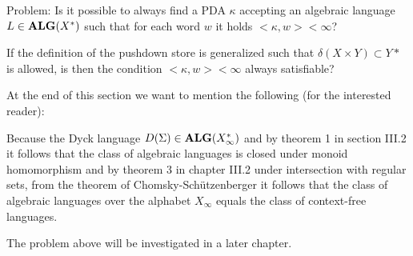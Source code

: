 Problem: Is it possible to always find a PDA $\kappa$ accepting an algebraic
language $L \in \mbox{{\bf ALG}}(X^*)$ such that for each word $w$ it holds 
${<}\kappa, w{>} < \infty$?

If the definition of the pushdown store is generalized such that $\delta(X
\times Y) \subset Y*$ is allowed, is then the condition ${<}\kappa, w{>} <
\infty$ always satisfiable?

At the end of this section we want to mention the following (for the interested
reader):

Because the Dyck language $D(\Sigma) \in \mbox{{\bf ALG}}(X_\infty^*)$ and by theorem 1
in section III.2 it follows that the class of algebraic languages is closed
under monoid homomorphism and by theorem 3 in chapter III.2 under intersection 
with regular sets, from the theorem of Chomsky-Schützenberger it follows that
the class of algebraic languages over the alphabet $X_\infty$ equals the class 
of context-free languages.

The problem above will be investigated in a later chapter.
